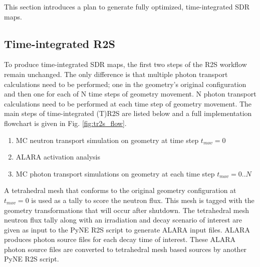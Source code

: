 This section introduces a plan to generate fully optimized, time-integrated
SDR maps.


\subsection{Time-integrated R2S}\label{sec:tr2s}
To produce time-integrated SDR maps, the
first two steps of the R2S workflow remain unchanged.
The only difference is that multiple photon transport calculations need
to be performed; one in the geometry's original configuration and then
one for each of N time steps of geometry movement.
N photon transport calculations need to be performed at each
time step of geometry movement.  The main steps of time-integrated (T)R2S
are listed below and a full implementation flowchart is given in Fig. \ref{fig:tr2s_flow}.
\begin{enumerate}
	\item{MC neutron transport simulation on geometry at time step $t_{mov}=0$}
	\item{ALARA activation analysis} 
	\item{MC photon transport simulations on geometry at each time step $t_{mov}=0..N$}
\end{enumerate}
A tetrahedral mesh that conforms to
the original geometry configuration at $t_{mov}=0$ is used as a tally to score the neutron flux.
This mesh is tagged with the geometry transformations that will occur after
shutdown.  The tetrahedral mesh neutron flux tally along with an irradiation and decay
scenario of interest are given as input to the PyNE R2S
script to generate ALARA input files.  ALARA produces photon source
files for each decay time of interest.  These ALARA photon source files are
converted to tetrahedral mesh based sources by another PyNE R2S script.  

